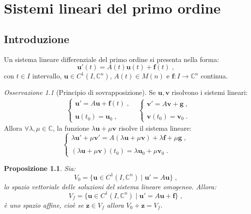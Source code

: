 \documentclass[a4paper,12pt]{report}
\theoremstyle{plain}
\newtheorem{prop}{Proposizione}[section]
\theoremstyle{definition}
\theoremstyle{remark}
\newtheorem{oss}{Osservazione}[section]
\numberwithin{equation}{section}
\begin{document}
\chapter{Sistemi lineari del primo ordine}
\section{Introduzione}
Un sistema lineare differenziale del primo ordine si presenta nella forma:
\begin{equation}
\mathbf{u}'(t)=A(t)\mathbf{u}(t)+\mathbf{f}(t)\;,
\end{equation}
con $t \in I$ intervallo, $\mathbf{u} \in C^1(I,\mathbb{C}^n)$, $A(t) \in M(n)$ e $\mathbf{f}:I \to \mathbb{C}^n$ continua. \\
\begin{oss}[Principio di sovrapposizione] Se $\mathbf{u},\mathbf{v}$ risolvono i sistemi lineari:
\begin{align}
&\begin{cases}
\mathbf{u}'=A\mathbf{u}+\mathbf{f}(t)\;, \\
\\
\mathbf{u}(t_0)=\mathbf{u}_0\;,
\end{cases}
&\begin{cases}
\mathbf{v}'=A\mathbf{v}+\mathbf{g}\;, \\
\\
\mathbf{v}(t_0)=\mathbf{v}_0\;.
\end{cases}
\end{align}
Allora $\forall \lambda,\mu \in \mathbb{C}$, la funzione $\lambda \mathbf{u}+\mu \mathbf{v}$ risolve il sistema lineare:
\begin{equation}
\begin{cases}
 \lambda \mathbf{u}'+\mu \mathbf{v}'=A(\lambda \mathbf{u}+\mu \mathbf{v})+\lambda \mathbf{f}+\mu \mathbf{g}\;, \\
 \\
 (\lambda \mathbf{u}+\mu \mathbf{v})(t_0)= \lambda \mathbf{u}_0+\mu \mathbf{v}_0\;.
\end{cases}
\end{equation}
\end{oss}
\begin{prop} Sia:
\begin{equation}
V_0=\{\mathbf{u} \in C^1(I,\mathbb{C}^n)\;|\; \mathbf{u}'=A\mathbf{u}\}\;,
\end{equation}
lo spazio vettoriale delle soluzioni del sistema lineare omogeneo. Allora:
\begin{equation}
V_f=\{\mathbf{u} \in C^1(I,\mathbb{C}^n)\;|\; \mathbf{u}'=A\mathbf{u}+\mathbf{f}\}\;,
\end{equation}
è uno spazio affine, cioè se $\mathbf{z} \in V_f$ allora $V_0+\mathbf{z}=V_f$.
\end{prop}
\end{document}
